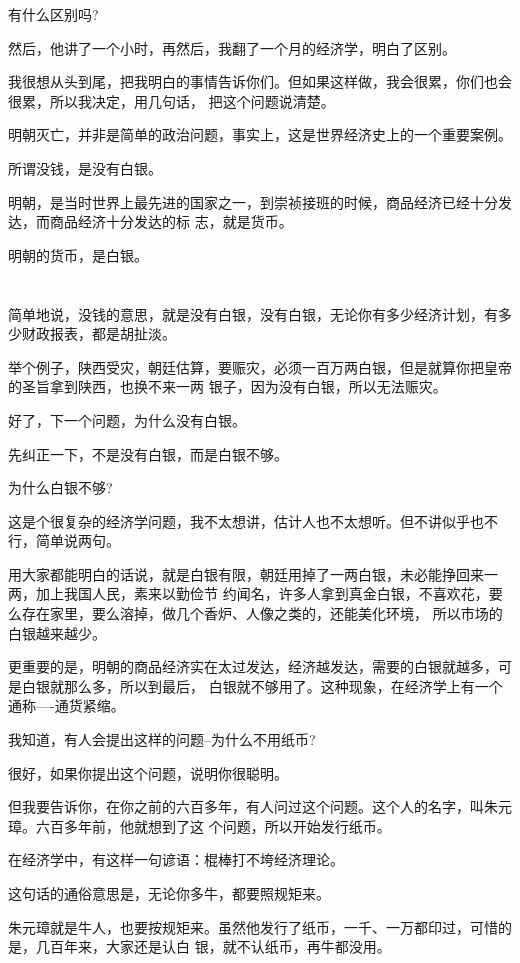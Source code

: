 \documentclass[11pt,a4paper,onecolumn]{article}
\begin{document}
有什么区别吗?

然后，他讲了一个小时，再然后，我翻了一个月的经济学，明白了区别。

我很想从头到尾，把我明白的事情告诉你们。但如果这样做，我会很累，你们也会很累，所以我决定，用几句话，
把这个问题说清楚。

明朝灭亡，并非是简单的政治问题，事实上，这是世界经济史上的一个重要案例。

所谓没钱，是没有白银。

明朝，是当时世界上最先进的国家之一，到崇祯接班的时候，商品经济已经十分发达，而商品经济十分发达的标
志，就是货币。

明朝的货币，是白银。

\section[\thesection]{}

简单地说，没钱的意思，就是没有白银，没有白银，无论你有多少经济计划，有多少财政报表，都是胡扯淡。

举个例子，陕西受灾，朝廷估算，要赈灾，必须一百万两白银，但是就算你把皇帝的圣旨拿到陕西，也换不来一两
银子，因为没有白银，所以无法赈灾。

好了，下一个问题，为什么没有白银。

先纠正一下，不是没有白银，而是白银不够。

为什么白银不够?

这是个很复杂的经济学问题，我不太想讲，估计人也不太想听。但不讲似乎也不行，简单说两句。

用大家都能明白的话说，就是白银有限，朝廷用掉了一两白银，未必能挣回来一两，加上我国人民，素来以勤俭节
约闻名，许多人拿到真金白银，不喜欢花，要么存在家里，要么溶掉，做几个香炉、人像之类的，还能美化环境，
所以市场的白银越来越少。

更重要的是，明朝的商品经济实在太过发达，经济越发达，需要的白银就越多，可是白银就那么多，所以到最后，
白银就不够用了。这种现象，在经济学上有一个通称----通货紧缩。

我知道，有人会提出这样的问题--为什么不用纸币?

很好，如果你提出这个问题，说明你很聪明。

但我要告诉你，在你之前的六百多年，有人问过这个问题。这个人的名字，叫朱元璋。六百多年前，他就想到了这
个问题，所以开始发行纸币。

在经济学中，有这样一句谚语：棍棒打不垮经济理论。

这句话的通俗意思是，无论你多牛，都要照规矩来。

朱元璋就是牛人，也要按规矩来。虽然他发行了纸币，一千、一万都印过，可惜的是，几百年来，大家还是认白
银，就不认纸币，再牛都没用。
\end{document}
